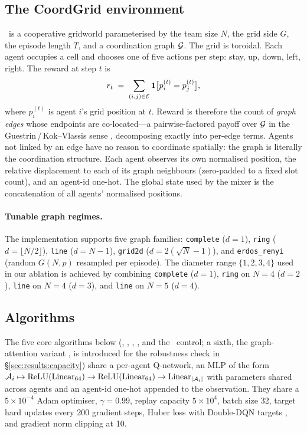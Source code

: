 \subsection{The CoordGrid environment}
\label{sec:env}

\coordgrid\ is a cooperative gridworld parameterised by the team size $N$,
the grid side $G$, the episode length $T$, and a coordination graph
$\mathcal{G}$. The grid is toroidal. Each agent occupies a cell and chooses one
of five actions per step: stay, up, down, left, right. The reward at step
$t$ is
\[
  r_t \;=\; \sum_{(i,j) \in \mathcal{E}} \mathbf{1}\bigl[p_i^{(t)} = p_j^{(t)}\bigr],
\]
where $p_i^{(t)}$ is agent $i$'s grid position at $t$. Reward is therefore
the count of \emph{graph edges} whose endpoints are co-located---a
pairwise-factored payoff over $\mathcal{G}$ in the Guestrin\,/\,Kok--Vlassis sense
\citep{guestrin_2002_coordrl,kok_2004_sparseq}, decomposing exactly into
per-edge terms. Agents not
linked by an edge have no reason to coordinate spatially: the graph is
literally the coordination structure. Each agent observes its own
normalised position, the relative displacement to each of its graph
neighbours (zero-padded to a fixed slot count), and an agent-id one-hot.
The global state used by the mixer is the concatenation of all agents'
normalised positions.

\paragraph{Tunable graph regimes.} The implementation supports five graph
families: \texttt{complete} ($d=1$), \texttt{ring} ($d=\lfloor N/2 \rfloor$),
\texttt{line} ($d = N-1$), \texttt{grid2d} ($d = 2(\sqrt N - 1)$), and
\texttt{erdos\_renyi} (random $G(N, p)$ resampled per episode). The
diameter range $\{1, 2, 3, 4\}$ used in our ablation is achieved by
combining \texttt{complete} ($d=1$), \texttt{ring} on $N=4$ ($d=2$),
\texttt{line} on $N=4$ ($d=3$), and \texttt{line} on $N=5$ ($d=4$).

\subsection{Algorithms}
\label{sec:algos}

The five core algorithms below (\iql, \vdn, \qmix, \gnnqmix, and the
\mlpqmix\ control; a sixth, the graph-attention variant \gatqmix, is
introduced for the robustness check in \S\ref{sec:results:capacity})
share a per-agent Q-network, an MLP of the form
$\mathcal{A}_i \mapsto \mathrm{ReLU}(\mathrm{Linear}_{64})
\rightarrow \mathrm{ReLU}(\mathrm{Linear}_{64})
\rightarrow \mathrm{Linear}_{|\mathcal{A}_i|}$ with parameters shared across
agents and an agent-id one-hot appended to the observation. They share a
$5\times 10^{-4}$ Adam optimiser, $\gamma = 0.99$, replay capacity $5\times10^4$,
batch size 32, target hard updates every 200 gradient steps, Huber loss
with Double-DQN targets \citep{vanhasselt_2016_doubledqn}, and gradient norm
clipping at 10.


